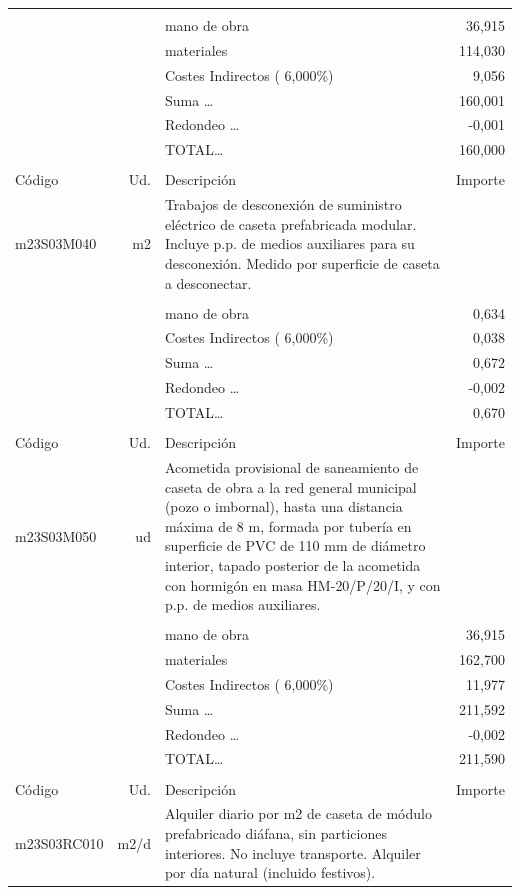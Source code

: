 \documentclass{book}%
\begin{document}
\begin{supertabular}{l r p{60mm} r}
&&&\\%
&&mano de obra&    36,915\\%
&&materiales&   114,030\\%
&&Costes Indirectos (     6,000\%)&     9,056\\%
&&Suma \ldots&   160,001\\%
&&Redondeo \ldots&    {-}0,001\\%
%
&&TOTAL\ldots&   160,000\\%
&&&\\%
Código&Ud.&Descripción&Importe\\%
\hline%
m23S03M040&m2&Trabajos de desconexión de suministro eléctrico de caseta prefabricada modular. Incluye p.p. de medios auxiliares para su desconexión. Medido por superficie de caseta a desconectar.&\\%
&&&\\%
&&mano de obra&     0,634\\%
&&Costes Indirectos (     6,000\%)&     0,038\\%
&&Suma \ldots&     0,672\\%
&&Redondeo \ldots&    {-}0,002\\%
%
&&TOTAL\ldots&     0,670\\%
&&&\\%
Código&Ud.&Descripción&Importe\\%
\hline%
m23S03M050&ud&Acometida provisional de saneamiento de caseta de obra a la red general municipal (pozo o imbornal), hasta una distancia máxima de 8 m, formada por tubería en superficie de PVC de 110 mm de diámetro interior, tapado posterior de la acometida con hormigón en masa HM{-}20/P/20/I, y con p.p. de medios auxiliares.&\\%
&&&\\%
&&mano de obra&    36,915\\%
&&materiales&   162,700\\%
&&Costes Indirectos (     6,000\%)&    11,977\\%
&&Suma \ldots&   211,592\\%
&&Redondeo \ldots&    {-}0,002\\%
%
&&TOTAL\ldots&   211,590\\%
&&&\\%
Código&Ud.&Descripción&Importe\\%
\hline%
m23S03RC010&m2/d&Alquiler diario por m2 de caseta de módulo prefabricado diáfana, sin particiones interiores. No incluye transporte. Alquiler por día natural (incluido festivos).&\\%

\end{supertabular}
\end{document}
